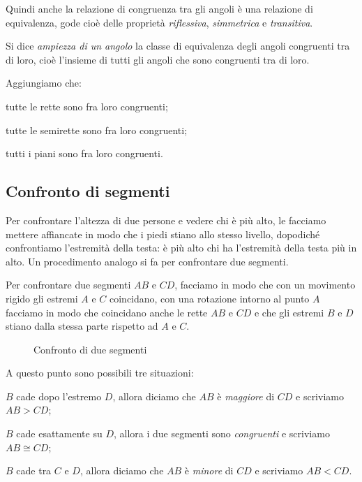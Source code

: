 Quindi anche la relazione di congruenza tra gli angoli è una 
relazione di equivalenza, gode cioè delle proprietà 
\emph{riflessiva}, \emph{simmetrica} e \emph{transitiva}.

\begin{definizione}
Si dice \emph{ampiezza di un angolo} la classe di equivalenza degli 
angoli congruenti tra di loro, cioè l'insieme di tutti gli angoli che 
sono congruenti tra di loro.
\end{definizione}

Aggiungiamo che:
\begin{itemize*}
\item tutte le rette sono fra loro congruenti;
\item tutte le semirette sono fra loro congruenti;
\item tutti i piani sono fra loro congruenti.
\end{itemize*}

\subsection{Confronto di segmenti}

Per confrontare l'altezza di due persone e vedere chi è più alto, le 
facciamo mettere affiancate in modo che i piedi stiano allo stesso 
livello, dopodiché confrontiamo l'estremità della testa: è più alto 
chi ha l'estremità della testa più in alto. Un procedimento analogo 
si fa per confrontare due segmenti.

Per confrontare due segmenti $AB$ e $CD$, facciamo in modo che con un 
movimento rigido gli estremi $A$ e $C$ coincidano, con una rotazione 
intorno al punto $A$ facciamo in  modo che coincidano anche le rette 
$AB$ e $CD$ e che gli estremi $B$ e $D$ stiano dalla stessa parte 
rispetto ad $A$ e $C$.


\begin{inaccessibleblock}
 \begin{figure}[htb]
\centering
\caption{Confronto di due segmenti}
\end{figure}
\end{inaccessibleblock}

A questo punto sono possibili tre situazioni:
\begin{itemize*}
\item $B$ cade dopo l'estremo $D$, allora diciamo che $AB$ è 
\emph{maggiore} di $CD$ e scriviamo $AB>CD$;
\item $B$ cade esattamente su $D$, allora i due segmenti sono 
\emph{congruenti} e scriviamo $AB\cong CD$;
\item $B$ cade tra $C$ e $D$, allora diciamo che $AB$ è \emph{minore} 
di $CD$ e scriviamo $AB<CD$.
\end{itemize*}

